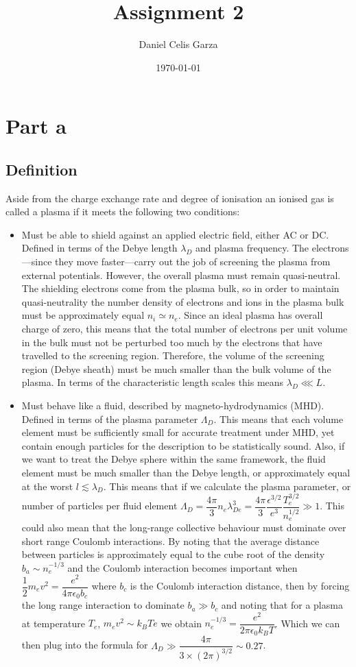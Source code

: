 \documentclass[10pt,a4paper]{article}
\title{Assignment 2}
\author{Daniel Celis Garza}
\date{\today}
\begin{document}
	\section{Part a}
	\subsection{Definition}
	Aside from the charge exchange rate and degree of ionisation an ionised gas is called a plasma if it meets the following two conditions:
	\begin{itemize}
		\item Must be able to shield against an applied electric field, either AC or DC. Defined in terms of the Debye length $\lambda_{D}$ and plasma frequency. The electrons---since they move faster---carry out the job of screening the plasma from external potentials. However, the overall plasma must remain quasi-neutral. The shielding electrons come from the plasma bulk, so in order to maintain quasi-neutrality the number density of electrons and ions in the plasma bulk must be approximately equal $n_{i} \simeq n_{e}$. Since an ideal plasma has overall charge of zero, this means that the total number of electrons per unit volume in the bulk must not be perturbed too much by the electrons that have travelled to the screening region. Therefore, the volume of the screening region (Debye sheath) must be much smaller than the bulk volume of the plasma. In terms of the characteristic length scales this means $\lambda_{D} \lll L$.
		\item Must behave like a fluid, described by magneto-hydrodynamics (MHD). Defined in terms of the plasma parameter $\Lambda_{D}$. This means that each volume element must be sufficiently small for accurate treatment under MHD, yet contain enough particles for the description to be statistically sound. Also, if we want to treat the Debye sphere within the same framework, the fluid element must be much smaller than the Debye length, or approximately equal at the worst $l \lesssim \lambda_{D}$. This means that if we calculate the plasma parameter, or number of particles per fluid element $\Lambda_{D} = \dfrac{4 \pi}{3} n_{e} \lambda_{De}^{3} = \dfrac{4 \pi}{3} \dfrac{\epsilon^{3/2}}{e^{3}} \dfrac{T_e^{3/2}}{n_{e}^{1/2}} \gg 1$. This could also mean that the long-range collective behaviour must dominate over short range Coulomb interactions. By noting that the average distance between particles is approximately equal to the cube root of the density $b_{a} \sim n_{e}^{-1/3}$ and the Coulomb interaction becomes important when $\dfrac{1}{2} m_{e} v^{2} = \dfrac{e^{2}}{4\pi \epsilon_{0} b_{c}}$ where $b_{c}$ is the Coulomb interaction distance, then by forcing the long range interaction to dominate $b_{a} \gg b_{c}$ and noting that for a plasma at temperature $T_{e}$, $m_{e} v^{2} \sim k_{B}Te$ we obtain $n_{e}^{-1/3} = \dfrac{e^{2}}{2\pi \epsilon_{0} k_{B} T}$. Which we can then plug into the formula for $\Lambda_{D} \gg \dfrac{4\pi}{3 \times (2\pi)^{3/2}} \sim 0.27$.
	\end{itemize}
\end{document}
